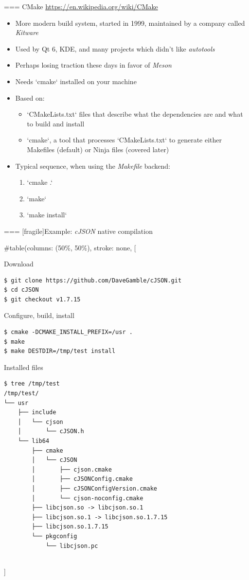 === {CMake}
  \url{https://en.wikipedia.org/wiki/CMake}
  \begin{itemize}
  \item More modern build system, started in 1999, maintained by a
    company called {\em Kitware}
  \item Used by Qt 6, KDE, and many projects which didn't like {\em
      autotools}
  \item Perhaps losing traction these days in favor of {\em Meson}
  \item Needs `cmake` installed on your machine
  \item Based on:
    \begin{itemize}
    \item `CMakeLists.txt` files that describe what the
      dependencies are and what to build and install
    \item `cmake`, a tool that processes `CMakeLists.txt` to
      generate either Makefiles (default) or Ninja files (covered later)
    \end{itemize}
  \item Typical sequence, when using the {\em Makefile} backend:
    \begin{enumerate}
    \item `cmake .`
    \item `make`
    \item `make install`
    \end{enumerate}
  \end{itemize}


=== [fragile]{Example: {\em cJSON} native compilation}

  
#table(columns: (50\%, 50\%), stroke: none,
[
    \begin{block}{Download}
      {\tiny
\begin{verbatim}
$ git clone https://github.com/DaveGamble/cJSON.git
$ cd cJSON
$ git checkout v1.7.15
\end{verbatim}
      }
    \end{block}

    \begin{block}{Configure, build, install}
      {\tiny
\begin{verbatim}
$ cmake -DCMAKE_INSTALL_PREFIX=/usr .
$ make
$ make DESTDIR=/tmp/test install
\end{verbatim}
      }
    \end{block}
    \begin{block}{Installed files}
      {\tiny
\begin{verbatim}
$ tree /tmp/test
/tmp/test/
└── usr
    ├── include
    │   └── cjson
    │       └── cJSON.h
    └── lib64
        ├── cmake
        │   └── cJSON
        │       ├── cjson.cmake
        │       ├── cJSONConfig.cmake
        │       ├── cJSONConfigVersion.cmake
        │       └── cjson-noconfig.cmake
        ├── libcjson.so -> libcjson.so.1
        ├── libcjson.so.1 -> libcjson.so.1.7.15
        ├── libcjson.so.1.7.15
        └── pkgconfig
            └── libcjson.pc
\end{verbatim}
      }
    \end{block}
  \\]



